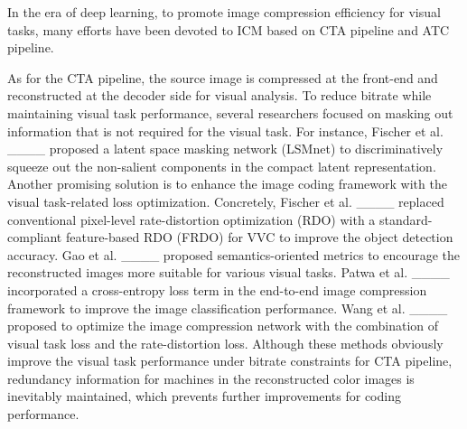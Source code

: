 \textcolor[rgb]{0,0,0}{In the era of deep learning, to promote image compression efficiency for visual tasks, many efforts have been devoted to ICM based on CTA pipeline and ATC pipeline.}

As for the CTA pipeline, the source image is compressed at the front-end and reconstructed at the decoder side for visual analysis. \textcolor[rgb]{0,0,0}{To reduce bitrate while maintaining visual task performance}, several researchers focused on masking out information that is not required for the visual task. For instance, Fischer et al. ____ proposed a latent space masking network (LSMnet) to discriminatively squeeze out the non-salient components in the compact latent representation. Another promising solution is to enhance the image coding framework with the visual task-related loss optimization. Concretely, Fischer et al. ____ replaced conventional pixel-level rate-distortion optimization (RDO) with a standard-compliant feature-based RDO (FRDO) for VVC to improve the object detection accuracy. \textcolor[rgb]{0,0,0}{Gao et al. ____ proposed semantics-oriented metrics to encourage the reconstructed images more suitable for various visual tasks.} Patwa et al. ____ incorporated a cross-entropy loss term in the end-to-end image compression framework to improve the image classification performance.  Wang et al. ____ proposed to optimize the image compression network with the combination of visual task loss and the rate-distortion loss. \textcolor[rgb]{0,0,0}{Although these methods obviously improve the visual task performance under bitrate constraints for CTA pipeline, redundancy information for machines in the reconstructed color images is inevitably maintained, which prevents further improvements for coding performance.}



